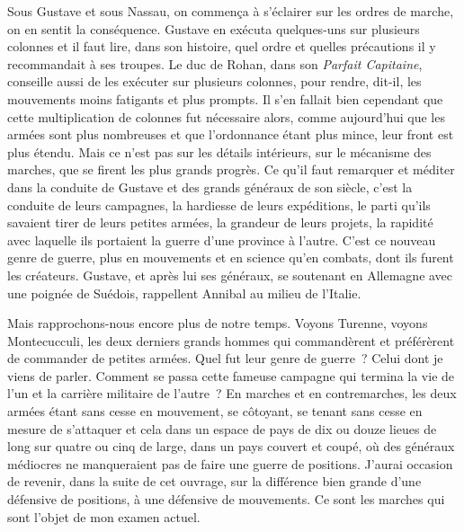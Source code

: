\documentclass[french,twoside]{book} %
\begin{document}
Sous Gustave et sous Nassau, on commença à s’éclairer sur les ordres de marche, on en sentit la conséquence. Gustave en exécuta quelques-uns sur plusieurs colonnes et il faut lire, dans son histoire, quel ordre et quelles précautions il y recommandait à ses troupes. Le duc de Rohan, dans son {\itshape Parfait Capitaine}, conseille aussi de les exécuter sur plusieurs colonnes, pour rendre, dit-il, les mouvements moins fatigants et plus prompts. Il s’en fallait bien cependant que cette multiplication de colonnes fut nécessaire alors, comme aujourd’hui que les armées sont plus nombreuses et que l’ordonnance étant plus mince, leur front est plus étendu. Mais ce n’est pas sur les détails intérieurs, sur le mécanisme des marches, que se firent les plus grands progrès. Ce qu’il faut remarquer et méditer dans la conduite de Gustave et des grands généraux de son siècle, c’est la conduite de leurs campagnes, la hardiesse de leurs expéditions, le parti qu’ils savaient tirer de leurs petites armées, la grandeur de leurs projets, la rapidité avec laquelle ils portaient la guerre d’une province à l’autre. C’est ce nouveau genre de guerre, plus en mouvements et en science qu’en combats, dont ils furent les créateurs. Gustave, et après lui ses généraux, se soutenant en Allemagne avec une poignée de Suédois, rappellent Annibal au milieu de l’Italie.\par
Mais rapprochons-nous encore plus de notre temps. Voyons Turenne, voyons Montecucculi, les deux derniers grands hommes qui commandèrent et préférèrent de commander de petites armées. Quel fut leur genre de guerre ? Celui dont je viens de parler. Comment se passa cette fameuse campagne qui termina la vie de l’un et la carrière militaire de l’autre ? En marches et en contremarches, les deux armées étant sans cesse en mouvement, se côtoyant, se tenant sans cesse en mesure de s’attaquer et cela dans un espace de pays de dix ou douze lieues de long sur quatre ou cinq de large, dans un pays couvert et coupé, où des généraux médiocres ne manqueraient pas de faire une guerre de positions. J’aurai occasion de revenir, dans la suite de cet ouvrage, sur la différence bien grande d’une défensive de positions, à une défensive de mouvements. Ce sont les marches qui sont l’objet de mon examen actuel.\par
\end{document}
